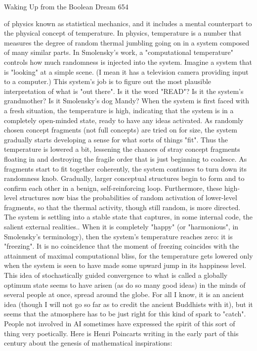 Waking Up from the Boolean Dream                                                     654

of physics known as statistical mechanics, and it includes a mental counterpart to the
physical concept of temperature. In physics, temperature is a number that measures
the degree of random thermal jumbling going on in a system composed of many
similar parts. In Smolensky's work, a "computational temperature" controls how much
randomness is injected into the system.
        Imagine a system that is "looking" at a simple scene. (I mean it has a
television camera providing input to a computer.) This system's job is to figure out the
most plausible interpretation of what is "out there". Is it the word "READ"? Is it the
system's grandmother? Is it Smolensky's dog Mandy? When the system is first faced
with a fresh situation, the temperature is high, indicating that the system is in a
completely open-minded state, ready to have any ideas activated. As randomly chosen
concept fragments (not full concepts) are tried on for size, the system gradually starts
developing a sense for what sorts of things "fit". Thus the temperature is lowered a
bit, lessening the chances of stray concept fragments floating in and destroying the
fragile order that is just beginning to coalesce. As fragments start to fit together
coherently, the system continues to turn down its randomness knob.
        Gradually, larger conceptual structures begin to form and to confirm each
other in a benign, self-reinforcing loop. Furthermore, these high-level structures now
bias the probabilities of random activation of lower-level fragments, so that the
thermal activity, though still random, is more directed. The system is settling into a
stable state that captures, in some internal code, the salient external realities.. When it
is completely "happy" (or "harmonious", in Smolensky's terminology), then the
system's temperature reaches zero: it is "freezing". It is no coincidence that the
moment of freezing coincides with the attainment of maximal computational bliss, for
the temperature gets lowered only when the system is seen to have made some
upward jump in its happiness level.
        This idea of stochastically guided convergence to what is called a globally
optimum state seems to have arisen (as do so many good ideas) in the minds of
several people at once, spread around the globe. For all I know, it is an ancient idea
(though I will not go so far as to credit the ancient Buddhists with it), but it seems that
the atmosphere has to be just right for this kind of spark to "catch". People not
involved in AI sometimes have expressed the spirit of this sort of thing very
poetically. Here is Henri Poincarts writing in the early part of this century about the
genesis of mathematical inspirations:

